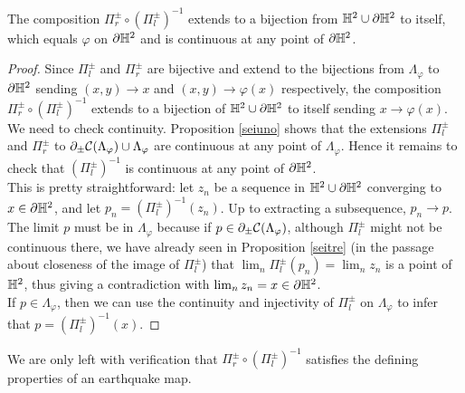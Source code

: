 \begin{corollary}\label{seiquattro}
    The composition $\Pi_r^\pm\circ(\Pi_l^\pm)^{-1}$ extends to a bijection from $\mathbb{H}^2\cup\partial\mathbb{H}^2$ to itself, which equals $\varphi$ on $\partial\mathbb{H}^2$ and is continuous at any point of $\partial\mathbb{H}^2$.
\end{corollary}
\begin{proof}
    Since $\Pi_l^\pm$ and $\Pi_r^\pm$ are bijective and extend to the bijections from $\Lambda_\varphi$ to $\partial\mathbb{H}^2$ sending $(x,y)\to x$ and $(x,y)\to\varphi(x)$ respectively, the composition $\Pi_r^\pm\circ(\Pi_l^\pm)^{-1}$ extends to a bijection of $\mathbb{H}^2\cup\partial\mathbb{H}^2$ to itself sending $x\to \varphi(x).$ \\
    We need to check continuity. Proposition \ref{seiuno} shows that the extensions $\Pi_l^\pm$ and $\Pi_r^\pm$ to $\partial_\pm\mathcal{C}(\Lambda_\varphi)\cup\Lambda_\varphi$ are continuous at any point of $\Lambda_\varphi$. Hence it remains to check that $(\Pi_l^\pm)^{-1}$ is continuous at any point of $\partial\mathbb{H}^{2}$.\\
    This is pretty straightforward: let $z_n$ be a sequence in $\mathbb{H}^2\cup\partial\mathbb{H}^2$ converging to $x\in\partial\mathbb{H}^2$, and let $p_n=(\Pi_l^\pm)^{-1}(z_n)$. Up to extracting a subsequence, $p_n\to p$. The limit $p$ must be in $\Lambda_\varphi$ because if $p\in\partial_\pm\mathcal{C}(\Lambda_\varphi)$, although $\Pi_l^\pm$ might not be continuous there, we have already seen in Proposition \ref{seitre} (in the passage about closeness of the image of $\Pi_l^\pm$) that $\lim_n\Pi_l^\pm(p_n)=\lim_n z_n$ is a point of $\mathbb{H}^2$, thus giving a contradiction with $\lim_n z_n=x\in\partial\mathbb{H}^2$. \\ 
    If $p\in\Lambda_\varphi$, then we can use the continuity and injectivity of $\Pi_l^\pm$ on $\Lambda_\varphi$ to infer that $p=(\Pi_l^\pm)^{-1}(x)$.

\end{proof}

We are only left with verification that $\Pi_r^\pm\circ(\Pi_l^\pm)^{-1}$ satisfies the defining properties of an earthquake map. 

